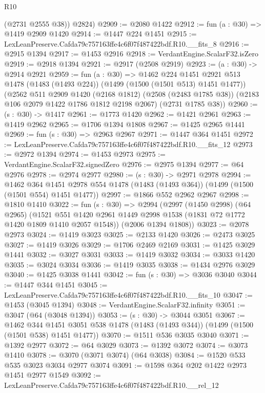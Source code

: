\begin{lexlean}{R10}
\begin{coremodule}
        (@2731 @2555 @38))
      @2824)
@2909 := @2080 @1422
@2912 := fun (a : @30) => @1419 @2909 @1420
@2914 := @1447 @224 @1451
@2915 := LexLeanPreserve.Cafda79c757163ffe4c6f07f487422bdf.R10.__fits_8
@2916 := @2915 @1394
@2917 := @1453 @2916
@2918 := VerdantEngine.ScalarF32.isZero
@2919 := @2918 @1394
@2921 := @2917 (@2508 @2919)
@2923 := (a : @30) -> @2914 @2921
@2959 := fun (a : @30) =>
  @1462
    @224
    @1451
    @2921
    @513
    @1478
    (@1483 (@1493 @224))
    (@1499 (@1500 (@1501 @513) @1451 @1477))
    (@2562
      @511
      @2909
      @1420
      (@2168 @1812)
      (@2508 (@2483 @1785 @38))
      (@2183 @106 @2079 @1422 @1786 @1812 @2198 @2067)
      (@2731 @1785 @38))
@2960 := (s : @30) -> @1417
@2961 := @1773 @1420
@2962 := @1421 @2961
@2963 := @1419 @2962
@2965 := @1706 @1394 @1808
@2967 := @1425 @2965 @1441
@2969 := fun (s : @30) => @2963 @2967
@2971 := @1447 @364 @1451
@2972 := LexLeanPreserve.Cafda79c757163ffe4c6f07f487422bdf.R10.__fits_12
@2973 := @2972 @1394
@2974 := @1453 @2973
@2975 := VerdantEngine.ScalarF32.signedZero
@2976 := @2975 @1394
@2977 := @64 @2976
@2978 := @2974 @2977
@2980 := (s : @30) -> @2971 @2978
@2994 := @1462
    @364
    @1451
    @2978
    @554
    @1478
    (@1483 (@1493 @364))
    (@1499 (@1500 (@1501 @554) @1451 @1477))
@2997 := @1866 @552 @2962 @2967
@2998 := @1810 @1410
@3022 := fun (s : @30) =>
  @2994
    (@2997
      (@1450 @2998)
      (@64 @2965)
      (@1521 @551 @1420 @2961 @1449 @2998 @1538 (@1831 @72 @1772 @1420 @1809 @1410 @2057 @1548))
      (@2006 @1394 @1808))
@3023 := @2078 @2973
@3024 := @1419 @3023
@3025 := @2133 @1420
@3026 := @2473 @3025
@3027 := @1419 @3026
@3029 := @1706 @2469 @2169
@3031 := @1425 @3029 @1441
@3032 := @3027 @3031
@3033 := @1419 @3032
@3034 := @3033 @1420
@3035 := @3024 @3034
@3036 := @1419 @3035
@3038 := @1434 @2976 @3029
@3040 := @1425 @3038 @1441
@3042 := fun (s : @30) => @3036 @3040
@3044 := @1447 @344 @1451
@3045 := LexLeanPreserve.Cafda79c757163ffe4c6f07f487422bdf.R10.__fits_10
@3047 := @1453 (@3045 @1394)
@3048 := VerdantEngine.ScalarF32.infinity
@3051 := @3047 (@64 (@3048 @1394))
@3053 := (s : @30) -> @3044 @3051
@3067 := @1462
    @344
    @1451
    @3051
    @538
    @1478
    (@1483 (@1493 @344))
    (@1499 (@1500 (@1501 @538) @1451 @1477))
@3070 := @1511 @536 @3035 @3040
@3071 := @1392 @2977
@3072 := @64 @3029
@3073 := @1392 @3072
@3074 := @3073 @1410
@3078 := @3070 (@3071 @3074) (@64 @3038)
@3084 := @1520 @533 @535 @3023 @3034 @2977 @3074
@3091 := @1598 @364 @202 @1422 @2973 @1451 @2977 @1549
@3092 := LexLeanPreserve.Cafda79c757163ffe4c6f07f487422bdf.R10.__rel_12

\end{coremodule}
\end{lexlean}
